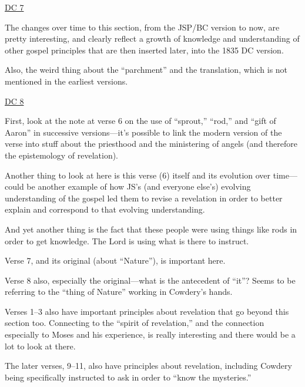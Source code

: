 \begin{compactdesc}
\begin{compactitem}
				\end{compactitem}
			\item \hyperref[DC7]{DC 7}
				\begin{compactitem}
					\item The changes over time to this section, from the JSP/BC version to now, are pretty interesting, and clearly reflect a growth of knowledge and understanding of other gospel principles that are then inserted later, into the 1835 DC version.
					\item Also, the weird thing about the ``parchment'' and the translation, which is not mentioned in the earliest versions.
				\end{compactitem}
			\item \hyperref[DC8]{DC 8}
				\begin{compactitem}
					\item First, look at the note at verse 6 on the use of ``sprout,'' ``rod,'' and ``gift of Aaron'' in successive versions---it's possible to link the modern version of the verse into stuff about the priesthood and the ministering of angels (and therefore the epistemology of revelation).
					\item Another thing to look at here is this verse (6) itself and its evolution over time---could be another example of how JS's (and everyone else's) evolving understanding of the gospel led them to revise a revelation in order to better explain and correspond to that evolving understanding.
					\item And yet another thing is the fact that these people were using things like rods in order to get knowledge. The Lord is using what is there to instruct.
						\begin{compactitem}
							\item Verse 7, and its original (about ``Nature''), is important here.
							\item Verse 8 also, especially the original---what is the antecedent of ``it''? Seems to be referring to the ``thing of Nature'' working in Cowdery's hands.
						\end{compactitem}
					\item Verses 1--3 also have important principles about revelation that go beyond this section too. Connecting to the ``spirit of revelation,'' and the connection especially to Moses and his experience, is really interesting and there would be a lot to look at there.
					\item The later verses, 9--11, also have principles about revelation, including Cowdery being specifically instructed to ask in order to ``know the mysteries.''

\end{compactitem}
\end{compactdesc}
